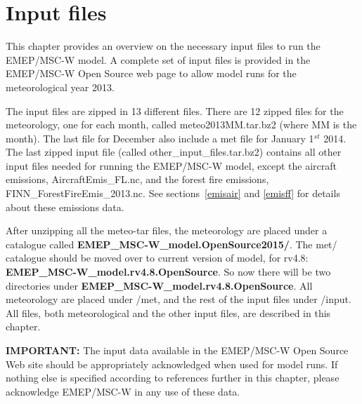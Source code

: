 \chapter{Input files}
\label{ch:InputFiles}

This chapter provides an overview on the necessary input files to run the 
EMEP/MSC-W model. A complete set of input files is provided in the EMEP/MSC-W 
Open Source web page to allow model runs for the meteorological year 2013. 

The input files are zipped in 13 different files. There are 12 zipped files 
for the meteorology, one for each month, called meteo2013MM.tar.bz2 (where MM 
is the month). 
The last file for December also include a met file for January 1$^{st}$ 2014. 
The last zipped input file (called other\_input\_files.tar.bz2) contains all 
other input files needed for running the EMEP/MSC-W model, except the aircraft emissions,
AircraftEmis\_FL.nc, and the forest fire emissions, FINN\_ForestFireEmis\_2013.nc. See sections~\ref{emisair} and \ref{emisff} for details about these emissions data.

After unzipping all the meteo-tar files, the meteorology are placed under a
catalogue called {\bf EMEP\_MSC-W\_model.OpenSource2015/}. The met/
catalogue should be moved over to current version of model, for rv4.8:
{\bf EMEP\_MSC-W\_model.rv4.8.OpenSource}. 
So now there will be two directories under 
{\bf EMEP\_MSC-W\_model.rv4.8.OpenSource}. 
All meteorology are placed under /met, and the rest of the input files under 
/input. 
All files, both meteorological and the other input files, are described in 
this chapter.

{\bf IMPORTANT:} The input data available in the EMEP/MSC-W Open Source Web
site should be appropriately acknowledged when used for model runs.
If nothing else is specified according to references further in this
chapter, please acknowledge EMEP/MSC-W in any use of these data.

